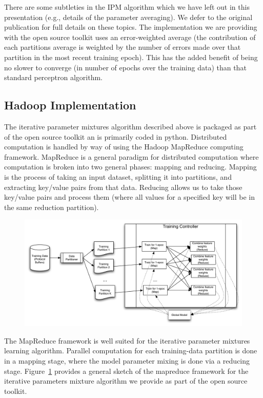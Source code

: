 \documentclass[a4paper]{article}
\begin{document}
There are some subtleties in the IPM algorithm which we have left out
in this presentation (e.g., details of the parameter averaging). We
defer to the original publication for full details on these topics.
The implementation we are providing with the open source toolkit uses
an error-weighted average (the contribution of each partitions
average is weighted by the number of errors made over that partition in the most
recent training epoch).  This has the added benefit of being no slower to
converge (in number of epochs over the training data) than that standard
perceptron algorithm.

\subsection{Hadoop Implementation}

The iterative parameter mixtures algorithm described above is packaged as part
of the open source toolkit an is primarily coded in python.  Distributed
computation is handled by way of using the Hadoop MapReduce computing framework.
MapReduce is a general paradigm for distributed computation
\cite{dean08mapreduce} where computation is broken into two general phases:
mapping and reducing.  Mapping is the process of taking an input dataset,
splitting it into partitions, and extracting key/value pairs from that data.
Reducing allows us to take those key/value pairs and process them (where all
values for a specified key will be in the same reduction partition).

\begin{figure}[h]
\centering \label{fig:hadoopipm} \includegraphics[width=1.1\textwidth]{graphics/mapreduceflow} 
\end{figure}

The MapReduce framework is well suited for the iterative parameter
mixtures learning algorithm. Parallel computation for each training-data
partition is done in a mapping stage, where the model parameter mixing
is done via a reducing stage. Figure~\ref{fig:hadoopipm} provides
a general sketch of the mapreduce framework for the iterative parameters
mixture algorithm we provide as part of the open source toolkit.
\end{document}
